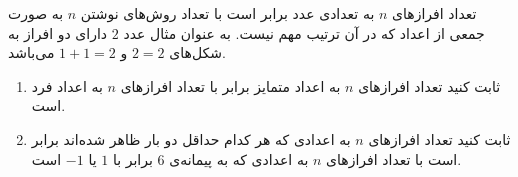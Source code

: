     \p 
تعداد افرازهای
$n$
به تعدادی عدد برابر است با تعداد روش‌های نوشتن
$n$
به صورت جمعی از اعداد که در آن ترتیب مهم نیست. به عنوان مثال عدد
$2$
دارای دو افراز به شکل‌های
$2 = 2$
و
$1 + 1 = 2$
می‌باشد.
\begin{enumerate}
\item
ثابت کنید تعداد افرازهای
$n$
به اعداد متمایز برابر با تعداد افرازهای
$n$
به اعداد فرد است.
\item
ثابت کنید تعداد افرازهای
$n$
به اعدادی که هر کدام حداقل دو بار ظاهر شده‌اند برابر است با تعداد افرازهای
$n$
به اعدادی که به پیمانه‌ی
$6$
برابر با
$1$
یا
$-1$
است.
\end{enumerate}
